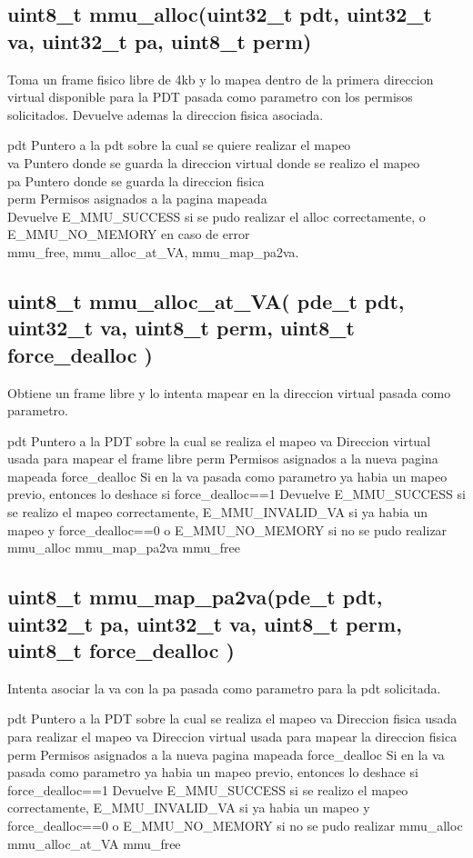 \documentclass[a4paper,10pt]{article}
\begin{document}
\subsection*{uint8\_t mmu\_alloc(uint32\_t  pdt, uint32\_t  va, uint32\_t  pa, uint8\_t perm)}
  Toma un frame fisico libre de 4kb y lo mapea dentro de la primera direccion virtual disponible para la 
   PDT pasada como parametro con los permisos solicitados. Devuelve ademas la direccion fisica asociada.
  
     pdt Puntero a la pdt sobre la cual se quiere realizar el mapeo \\
     va  Puntero donde se guarda la direccion virtual donde se realizo el mapeo\\
     pa  Puntero donde se guarda la direccion fisica\\
     perm Permisos asignados a la pagina mapeada\\
     Devuelve E\_MMU\_SUCCESS si se pudo realizar el alloc correctamente, o E\_MMU\_NO\_MEMORY en caso de error\\
     mmu\_free, mmu\_alloc\_at\_VA, mmu\_map\_pa2va.

\subsection*{uint8\_t mmu\_alloc\_at\_VA( pde\_t  pdt, uint32\_t va, uint8\_t perm, uint8\_t force\_dealloc )}
   Obtiene un frame libre y lo intenta mapear en la direccion virtual pasada como parametro.
  
     pdt Puntero a la PDT sobre la cual se realiza el mapeo
     va Direccion virtual usada para mapear el frame libre
     perm Permisos asignados a la nueva pagina mapeada
     force\_dealloc Si en la va pasada como parametro ya habia un mapeo previo, entonces lo deshace si force\_dealloc==1
     Devuelve E\_MMU\_SUCCESS si se realizo el mapeo correctamente, E\_MMU\_INVALID\_VA si ya habia un mapeo y force\_dealloc==0 o E\_MMU\_NO\_MEMORY si no se pudo realizar
     mmu\_alloc
     mmu\_map\_pa2va
     mmu\_free
     
\subsection*{uint8\_t mmu\_map\_pa2va(pde\_t  pdt, uint32\_t pa, uint32\_t va, uint8\_t perm, uint8\_t force\_dealloc )}   Intenta asociar la va con la pa pasada como parametro para la pdt solicitada.
  
     pdt Puntero a la PDT sobre la cual se realiza el mapeo
     va Direccion fisica usada para realizar el mapeo
     va Direccion virtual usada para mapear la direccion fisica
     perm Permisos asignados a la nueva pagina mapeada
     force\_dealloc Si en la va pasada como parametro ya habia un mapeo previo, entonces lo deshace si force\_dealloc==1
     Devuelve E\_MMU\_SUCCESS si se realizo el mapeo correctamente, E\_MMU\_INVALID\_VA si ya habia un mapeo y force\_dealloc==0 o E\_MMU\_NO\_MEMORY si no se pudo realizar
     mmu\_alloc
     mmu\_alloc\_at\_VA
     mmu\_free
\end{document}
